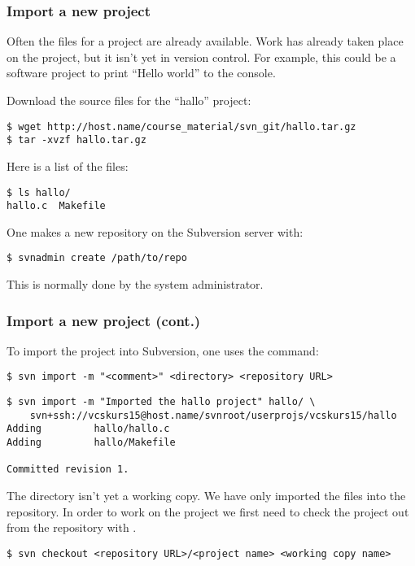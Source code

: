 \begin{frame}[fragile]
\frametitle{Import a new project}
\linuxframe

Often the files for a project are already available.  Work has already taken
place on the project, but it isn't yet in version control.  For example,
this could be a software project to print \enquote{Hello world} to the
console.

Download the source files for the \enquote{hallo} project:
\begin{lstlisting}[basicstyle=\tiny\ttfamily\color{black}]
$ wget http://host.name/course_material/svn_git/hallo.tar.gz
$ tar -xvzf hallo.tar.gz
\end{lstlisting}

Here is a list of the files:
\begin{lstlisting}
$ ls hallo/
hallo.c  Makefile
\end{lstlisting}

One makes a new repository on the Subversion server with:
\begin{lstlisting}
$ svnadmin create /path/to/repo
\end{lstlisting}
This is normally done by the system administrator.

\end{frame}

\begin{frame}[fragile]
\frametitle{Import a new project (cont.)}
\linuxframe

To import the  project into Subversion, one uses the
 command:
\begin{lstlisting}
$ svn import -m "<comment>" <directory> <repository URL>
\end{lstlisting}

\begin{lstlisting}[basicstyle=\tiny\ttfamily\color{black}]
$ svn import -m "Imported the hallo project" hallo/ \
    svn+ssh://vcskurs15@host.name/svnroot/userprojs/vcskurs15/hallo
Adding         hallo/hallo.c
Adding         hallo/Makefile

Committed revision 1.
\end{lstlisting}

The  directory isn't yet a working copy.  We have only
imported the files into the repository.  In order to work on the project we
first need to check the project out from the repository with \ttalert{svn
checkout}.
\begin{lstlisting}
$ svn checkout <repository URL>/<project name> <working copy name>
\end{lstlisting}

\end{frame}

